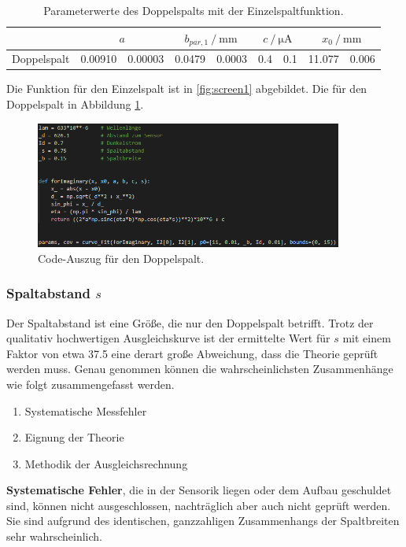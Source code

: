 \begin{table}
    \centering
    \caption{Parameterwerte des Doppelspalts mit der Einzelspaltfunktion.}
    \label{tab:parDoppelEinzel}
    \begin{tabular}{c S[table-format=1.5]@{\,\( \pm \)\,}S[table-format=1.5] 
        S[table-format=1.4]@{\,\( \pm \)\,}S[table-format=1.4] 
        S[table-format=1.1]@{\,\( \pm \)\,}S[table-format=1.1]
        S[table-format=1.3]@{\,\( \pm \)\,}S[table-format=1.3]}
        \toprule
        &  &  &  &  \\
        \midrule
        Doppelspalt & 0.00910&0.00003 & 0.0479&0.0003 & 0.4&0.1 & 11.077&0.006\\
    \end{tabular}
\end{table}

Die Funktion für den Einzelspalt ist in \ref{fig:screen1} abgebildet. Die für den Doppelspalt in Abbildung \ref{fig:screen2}.

\begin{figure}
    \centering
    \includegraphics[width=0.9\textwidth]{plots/screen2.png}
    \caption{Code-Auszug für den Doppelspalt.}
    \label{fig:screen2}
\end{figure}

\subsubsection{Spaltabstand $s$}
Der Spaltabstand ist eine Größe, die nur den Doppelspalt betrifft. Trotz der qualitativ hochwertigen Ausgleichskurve ist der ermittelte Wert für $s$ mit einem Faktor
von etwa 37.5 eine derart große Abweichung, dass die Theorie geprüft werden muss.
Genau genommen können die wahrscheinlichsten Zusammenhänge wie folgt zusammengefasst werden.
\begin{enumerate}
    \item Systematische Messfehler
    \item Eignung der Theorie
    \item Methodik der Ausgleichsrechnung
\end{enumerate}
\textbf{Systematische Fehler}, die in der Sensorik liegen oder dem Aufbau geschuldet sind, können nicht ausgeschlossen, nachträglich aber auch nicht geprüft werden.
Sie sind aufgrund des identischen, ganzzahligen Zusammenhangs der Spaltbreiten sehr wahrscheinlich.

